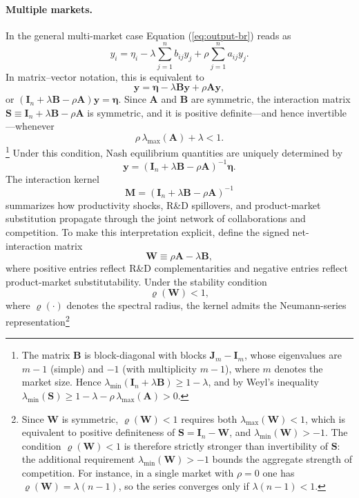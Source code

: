 \paragraph{Multiple markets.}
In the general multi-market case Equation (\ref{eq:output-br}) reads as
\[
y_{i} = \eta_{i} - \lambda \sum_{j=1}^{n}b_{ij}y_{j} + \rho \sum_{j=1}^{n}a_{ij}y_{j}.
\]
In matrix--vector notation, this is equivalent to
\[
\mathbf{y} = \boldsymbol{\eta} - \lambda \mathbf{B}\mathbf{y} + \rho \mathbf{A}\mathbf{y},
\]
or $(\mathbf{I}_{n} + \lambda \mathbf{B} - \rho \mathbf{A})\mathbf{y} =
\boldsymbol{\eta}$. Since $\mathbf A$ and $\mathbf B$ are symmetric, the
interaction matrix $\mathbf{S} \equiv \mathbf{I}_n + \lambda \mathbf{B} - \rho
\mathbf{A}$ is symmetric, and it is positive definite---and hence
invertible---whenever
\[
\rho\,\lambda_{\max}(\mathbf{A}) + \lambda < 1 .
\]
\footnote{The matrix $\mathbf B$ is block-diagonal with blocks
$\mathbf J_m-\mathbf I_m$, whose eigenvalues are $m-1$ (simple) and $-1$ (with
multiplicity $m-1$), where $m$ denotes the market size. Hence
$\lambda_{\min}(\mathbf I_n+\lambda\mathbf B)\geq 1-\lambda$, and by Weyl's
inequality
$\lambda_{\min}(\mathbf S)\geq 1-\lambda-\rho\,\lambda_{\max}(\mathbf A)>0$.}
Under this condition, Nash equilibrium quantities are uniquely determined by
\[
\mathbf{y} = (\mathbf{I}_n + \lambda \mathbf{B} - \rho \mathbf{A})^{-1} \boldsymbol{\eta}.
\]
The interaction kernel
\begin{equation}
\mathbf{M}
=
(\mathbf{I}_n+\lambda \mathbf{B}-\rho \mathbf{A})^{-1}
\label{eq:kernel}
\end{equation}
summarizes how productivity shocks, R\&D spillovers, and product-market
substitution propagate through the joint network of collaborations and
competition. To make this interpretation explicit, define the signed
net-interaction matrix
\[
\mathbf{W}\equiv \rho \mathbf{A}-\lambda \mathbf{B},
\]
where positive entries reflect R\&D complementarities and negative entries
reflect product-market substitutability. Under the stability condition
\[
\varrho(\mathbf{W})<1,
\]
where $\varrho(\cdot)$ denotes the spectral radius, the kernel admits the
Neumann-series representation\footnote{Since $\mathbf W$ is symmetric,
$\varrho(\mathbf W)<1$ requires both $\lambda_{\max}(\mathbf W)<1$, which is
equivalent to positive definiteness of $\mathbf S=\mathbf I_n-\mathbf W$, and
$\lambda_{\min}(\mathbf W)>-1$. The condition $\varrho(\mathbf W)<1$ is
therefore strictly stronger than invertibility of $\mathbf S$: the additional
requirement $\lambda_{\min}(\mathbf W)>-1$ bounds the aggregate strength of
competition. For instance, in a single market with $\rho=0$ one has
$\varrho(\mathbf W)=\lambda(n-1)$, so the series converges only if
$\lambda(n-1)<1$.}

